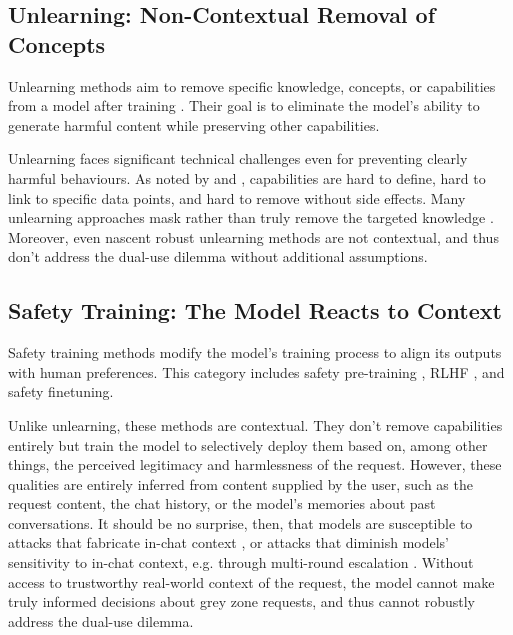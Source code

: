 \documentclass{article}
\theoremstyle{plain}
\theoremstyle{definition}
\theoremstyle{remark}
\begin{document}
\subsection{Unlearning: Non-Contextual Removal of Concepts}

Unlearning methods aim to remove specific knowledge, concepts, or
capabilities from a model after training
\cite{liu2024rethinkingmachineunlearninglarge}. Their goal is to
eliminate the model's ability to generate harmful content while
preserving other capabilities.

Unlearning faces significant technical challenges even for preventing
clearly harmful behaviours. As noted by \citet{cooper2024machineunlearningdoesntthink} and
\citet{barez2025openproblemsmachineunlearning}, capabilities are hard
to define, hard to link to specific data points, and hard to remove
without side effects. Many unlearning approaches mask rather than
truly remove the targeted knowledge
\cite{deeb2025unlearningmethodsremoveinformation}. Moreover, even
nascent robust unlearning methods
\cite{cloud2024gradientroutingmaskinggradients,lee2025distillationrobustifiesunlearning} are not contextual,
and thus don't address the dual-use dilemma without additional assumptions.

\subsection{Safety Training: The Model Reacts to Context}

Safety training methods modify the model's training process to align
its outputs with human preferences.
This category includes safety pre-training \cite{maini2025safetypretraininggenerationsafe}, RLHF \cite{christiano2023deepreinforcementlearninghuman}, and safety finetuning.

Unlike unlearning, these methods are contextual.
They don't remove capabilities entirely but train the model to selectively deploy them based on, among other things, the perceived legitimacy and harmlessness of the request.
However, these qualities are entirely inferred from content supplied by the user, such as the request content, the chat history, or the model's memories about past conversations.
It should be no surprise, then, that models are susceptible to attacks that fabricate in-chat context \cite{zeng2024johnnypersuadellmsjailbreak}, or attacks that diminish models' sensitivity to in-chat context, e.g. through multi-round escalation \cite{russinovich2025greatwritearticlethat}.
Without access to trustworthy real-world context of the request, the model cannot make truly informed decisions about grey zone requests, and thus cannot robustly address the dual-use dilemma.
\end{document}
